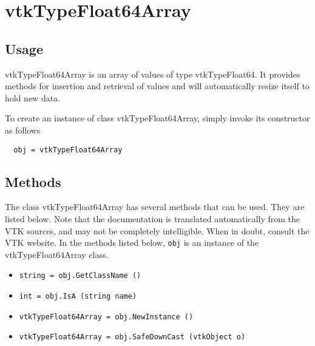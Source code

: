 \section{vtkTypeFloat64Array}

\subsection{Usage}

 vtkTypeFloat64Array is an array of values of type vtkTypeFloat64.  It
 provides methods for insertion and retrieval of values and will
 automatically resize itself to hold new data.

To create an instance of class vtkTypeFloat64Array, simply
invoke its constructor as follows
\begin{verbatim}
  obj = vtkTypeFloat64Array
\end{verbatim}
\subsection{Methods}

The class vtkTypeFloat64Array has several methods that can be used.
  They are listed below.
Note that the documentation is translated automatically from the VTK sources,
and may not be completely intelligible.  When in doubt, consult the VTK website.
In the methods listed below, \verb|obj| is an instance of the vtkTypeFloat64Array class.
\begin{itemize}
\item  \verb|string = obj.GetClassName ()|

\item  \verb|int = obj.IsA (string name)|

\item  \verb|vtkTypeFloat64Array = obj.NewInstance ()|

\item  \verb|vtkTypeFloat64Array = obj.SafeDownCast (vtkObject o)|

\end{itemize}
